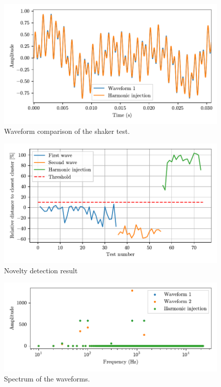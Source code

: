 \begin{figure}
    \centering
    \includegraphics{Images/shaker/Figure_1.pdf}
    \caption{Waveform comparison of the shaker test.}
    \label{fig:shaker}
\end{figure}

\begin{figure}
    \centering
    \includegraphics{Images/shaker/Results.pdf}
    \caption{Novelty detection result}
    \label{fig:shaker_results}
\end{figure}

\begin{figure}
    \centering
    \includegraphics{Images/shaker/spectrum.pdf}
    \caption{Spectrum of the waveforms.}
    \label{fig:shaker_spectrum}
\end{figure}

